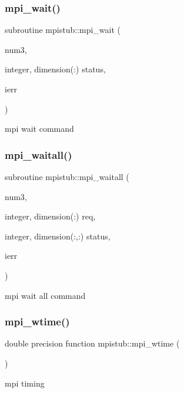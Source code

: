 \subsubsection{\texorpdfstring{mpi\_wait()}{mpi\_wait()}}
{\footnotesize\ttfamily subroutine mpistub\+::mpi\+\_\+wait (\begin{DoxyParamCaption}\item[{}]{num3,  }\item[{integer, dimension(\+:)}]{status,  }\item[{}]{ierr }\end{DoxyParamCaption})}



mpi wait command 

\mbox{\label{namespacempistub_ae67c78bda40eb1d1e4dbd6c69afc6201}} 
\subsubsection{\texorpdfstring{mpi\_waitall()}{mpi\_waitall()}}
{\footnotesize\ttfamily subroutine mpistub\+::mpi\+\_\+waitall (\begin{DoxyParamCaption}\item[{}]{num3,  }\item[{integer, dimension(\+:)}]{req,  }\item[{integer, dimension(\+:,\+:)}]{status,  }\item[{}]{ierr }\end{DoxyParamCaption})}



mpi wait all command 

\mbox{\label{namespacempistub_a2456432a60801629e19273ebe4114bc9}} 
\subsubsection{\texorpdfstring{mpi\_wtime()}{mpi\_wtime()}}
{\footnotesize\ttfamily double precision function mpistub\+::mpi\+\_\+wtime (\begin{DoxyParamCaption}{ }\end{DoxyParamCaption})}



mpi timing 

